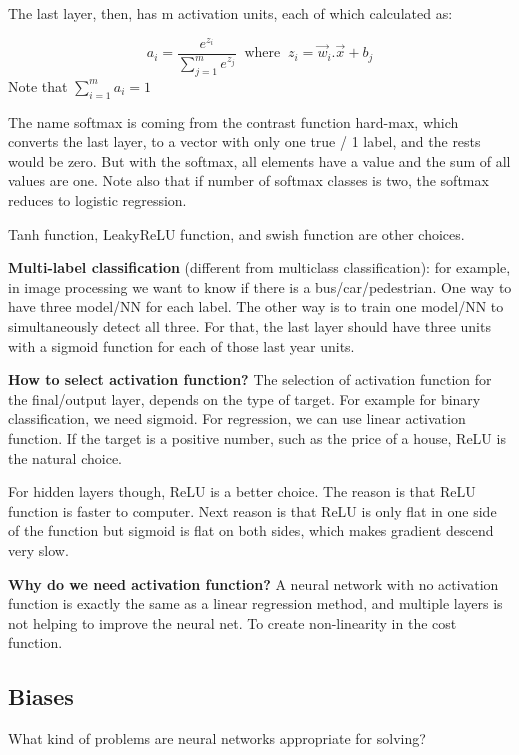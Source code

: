 \documentclass[12pt]{report}
\begin{document}
The last layer, then, has m activation units, each of which calculated as:

\begin{equation}
  a_i = \frac{e^{z_i}}{ \sum_{j=1}^{m} e^{z_j} } \;\; \text{where} \;\; z_i= \overrightarrow{w}_i. \overrightarrow{x}+b_j
\end{equation}
Note that $\sum_{i = 1}^{m}  a_i = 1$

The name softmax is coming from the contrast function hard-max, which converts the last layer, to a vector with only one true / 1 label, and the rests would be zero. But with the softmax, all elements have a value and the sum of all values are one. Note also that if number of softmax classes is two, the softmax reduces to logistic regression.


Tanh function, LeakyReLU function, and swish function are other choices.


\textbf{Multi-label classification} (different from multiclass classification): for example, in image processing we want to know if there is a bus/car/pedestrian. One way to have three model/NN for each label. The other way is to train one model/NN to simultaneously detect all three. For that, the last layer should have three units with a sigmoid function for each of those last year units.


\textbf{How to select activation function?}
The selection of activation function for the final/output layer, depends on the type of target. For example for binary classification, we need sigmoid. For regression, we can use linear activation function. If the target is a positive number, such as the price of a house, ReLU is the natural choice.

For hidden layers though, ReLU is a better choice. The reason is that ReLU function is faster to computer. Next reason is that ReLU is only flat in one side of the function but sigmoid is flat on both sides, which makes gradient descend very slow.



\textbf{Why do we need activation function?}
A neural network with no activation function is exactly the same as a linear regression method, and multiple layers is not helping to improve the neural net.  To create non-linearity in the cost function.

\subsection{Biases}

What kind of problems are neural networks appropriate for solving?
\end{document}
